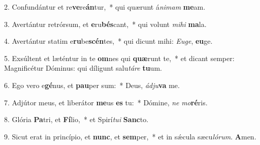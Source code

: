 2. Confundántur et re\textbf{ve}re\textbf{án}tur,~*  qui quærunt á\textit{ni}\textit{mam} \textbf{me}am.\

3. Avertántur retrórsum, et \textbf{e}ru\textbf{bés}cant,~*  qui volunt \textit{mi}\textit{hi} \textbf{ma}la.\

4. Avertántur statim e\textbf{ru}be\textbf{scén}tes,~*  qui dicunt mihi: \textit{Eu}\textit{ge}, \textbf{eu}ge.\

5. Exsúltent et læténtur in te \textbf{om}nes qui \textbf{quæ}runt te,~*  et dicant semper: Magnificétur Dóminus: qui díligunt salu\textit{tá}\textit{re} \textbf{tu}um.\

6. Ego vero e\textbf{gé}nus, et \textbf{pau}per sum:~*  Deus, \textit{ád}\textit{ju}\textbf{va} me.\

7. Adjútor meus, et liberátor \textbf{me}us \textbf{es} tu:~*  Dómine, \textit{ne} \textit{mo}\textbf{ré}ris.\

8. Glória \textbf{Pa}tri, et \textbf{Fí}lio,~*  et Spirí\textit{tu}\textit{i} \textbf{Sanc}to.\

9. Sicut erat in princípio, et \textbf{nunc}, et \textbf{sem}per,~*  et in sǽcula sæcu\textit{ló}\textit{rum}. \textbf{A}men.\

